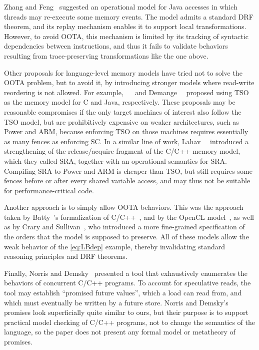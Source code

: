 Zhang and Feng~\cite{Zhang2016} suggested an operational model for Java accesses in which threads may re-execute some memory events.
The model admits a standard DRF theorem, and its replay mechanism enables it to support local transformations.
However, to avoid OOTA, this mechanism is limited by its tracking of syntactic dependencies between instructions,
and thus it fails to validate behaviors resulting from trace-preserving transformations like the one above.

Other proposals for language-level memory models have tried not to solve the OOTA problem, but to avoid it,
by introducing stronger models where read-write reordering is not allowed.
For example, \sevcik~\etal~\cite{compcerttso} and Demange~\etal~\cite{bmm} proposed using TSO as the memory model for C and Java, respectively. 
These proposals may be reasonable compromises if the only target machines of interest also follow the TSO model,
but are prohibitively expensive on weaker architectures, such as Power and ARM,
because enforcing TSO on those machines requires essentially as many fences as enforcing SC.
In a similar line of work, Lahav~\etal~\cite{sra} introduced a strengthening of the release/acquire fragment of the C/C++ memory model, which they called SRA, together with an operational semantics for SRA\@.
Compiling SRA to Power and ARM is cheaper than TSO, but still requires some fences before or after every shared variable access, and may thus not be suitable for performance-critical code.

Another approach is to simply allow OOTA behaviors.
This was the approach taken by Batty~\etal's formalization of C/C++~\cite{Batty:2011}, and by the OpenCL model~\cite{opencl-model},
as well as by Crary and Sullivan~\cite{Crary2015}, who introduced a more fine-grained specification of the orders that the model is supposed to preserve.
All of these models allow the weak behavior of the \ref{eq:LBdep} example, thereby invalidating standard reasoning principles and DRF theorems.

Finally, Norris and Demsky~\cite{CDSchecker} presented a tool
that exhaustively enumerates the behaviors of concurrent C/C++ programs.
To account for speculative reads, the tool may establish ``promised
future values'', which a load can read from, and which must eventually
be written by a future store.  Norris and Demsky's promises look
superficially quite similar to ours, but their purpose is to support
practical model checking of C/C++ programs, not to change the semantics
of the language, so the paper does not present any formal model or
metatheory of promises.



